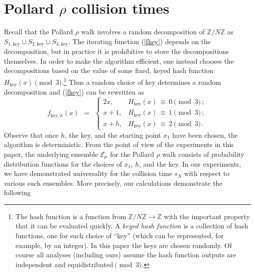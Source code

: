 \documentclass{llncs}
\newcommand{\secref}[1]{Section~\ref{#1}}
\numberwithin{equation}{section}
\newcommand{\Z}{{\mathbb{Z}}}
\renewcommand\({\left(}
\renewcommand\){\right)}
\begin{document}





\section{Pollard $\rho$ collision times}\label{sec:prho}

Recall that the Pollard $\rho$ walk involves a random decomposition of $\Z/N\Z$ as $S_{1,\text{key}}\sqcup S_{2,\text{key}}\sqcup S_{3,\text{key}}$.  The iterating function (\ref{fkey}) depends on the decomposition, but in practice  it is prohibitive to store the decompositions themselves.  In order to make the algorithm efficient, one instead chooses the decompositions based on the value of some fixed, keyed   hash function $H_{\text{key}}(x)\pmod 3$.\footnote{The hash function is a function from $\Z/N\Z\rightarrow \Z$ with the important property that it can be  evaluated quickly.  A {\it keyed hash function} is  a collection of hash functions, one for each choice of ``key'' (which can be represented, for example, by an integer).  In this paper the keys are chosen randomly.
Of course all analyses (including ours) assume the hash function outputs are independent and equidistributed$\pmod 3$.}   Thus a random choice of key determines a random decomposition  and (\ref{fkey}) can be rewritten as
  \begin{equation}\label{fkeyHash}
 f_{{\text{key}},h}(x) \ \ = \ \ \left\{
                                 \begin{array}{ll}
                                   2x, & H_{\text{key}}(x)\,\equiv\, 0\pmod 3\,; \\
                                   x+1, & H_{\text{key}}(x)\,\equiv\, 1\pmod 3\,; \\
                                   x+h, & H_{\text{key}}(x)\,\equiv\, 2\pmod 3\,.
                                 \end{array}
                               \right.
  \end{equation}
  Observe that once $h$, the key, and the starting point $x_1$ have been chosen, the algorithm is deterministic.
  From the point of view of the experiments in this paper, the underlying ensemble $\cal E_\rho$ for the Pollard $\rho$ walk consists of probability distribution functions for the choices of $x_1$, $h$, and the key.  In our experiments, we have demonstrated universality for the collision time $s_N$ with respect to various such ensembles.  More precisely, our calculations demonstrate the following
%
\\
\end{document}
